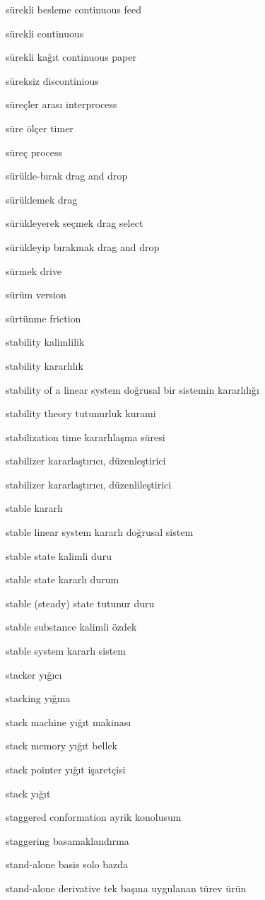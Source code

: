 \documentclass[12pt,fleqn]{article}\usepackage{../../common}
\begin{document}
sürekli besleme continuous feed

sürekli continuous

sürekli kağıt continuous paper

süreksiz discontinious

süreçler arası interprocess

süre ölçer timer

süreç process

sürükle-bırak drag and drop

sürüklemek drag

sürükleyerek seçmek drag select

sürükleyip bırakmak drag and drop

sürmek drive

sürüm version

sürtünme friction

stability kalimlilik

stability kararlılık

stability of a linear system doğrusal bir sistemin kararlılığı

stability theory tutunurluk kurami

stabilization time kararlılaşma süresi

stabilizer kararlaştırıcı, düzenleştirici

stabilizer kararlaştırıcı, düzenlileştirici

stable kararlı

stable linear system kararlı doğrusal sistem

stable state kalimli duru

stable state kararlı durum

stable (steady) state tutunur duru

stable substance kalimli özdek

stable system kararlı sistem

stacker yığıcı

stacking yığma

stack machine yığıt makinası

stack memory yığıt bellek

stack pointer yığıt işaretçisi

stack yığıt

staggered conformation ayrik konolusum

staggering basamaklandırma

stand-alone basis solo bazda

stand-alone derivative tek başına uygulanan türev ürün
\end{document}
